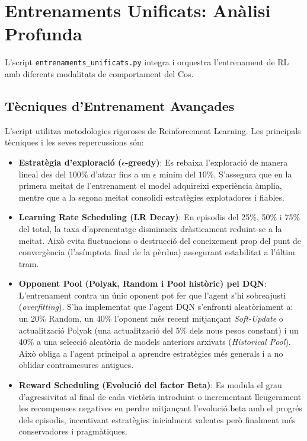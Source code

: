 \documentclass[a4paper,11pt]{article}
\begin{document}
\section{Entrenaments Unificats: Anàlisi Profunda}
L'script \texttt{entrenaments\_unificats.py} integra i orquestra l'entrenament de RL amb diferents modalitats de comportament del Cos.

\subsection{Tècniques d'Entrenament Avançades}
L'script utilitza metodologies rigoroses de Reinforcement Learning. Les principals tècniques i les seves repercussions són:
\begin{itemize}
    \item \textbf{Estratègia d'exploració ($\epsilon$-greedy)}: Es rebaixa l'exploració de manera lineal des del $100\%$ d'atzar fins a un $\epsilon$ mínim del $10\%$. S'assegura que en la primera meitat de l'entrenament el model adquireixi experiència àmplia, mentre que a la segona meitat consolidi estratègies explotadores i fiables.
    \item \textbf{Learning Rate Scheduling (LR Decay)}: En episodis del 25\%, 50\% i 75\% del total, la taxa d'aprenentatge disminueix dràsticament reduint-se a la meitat. Això evita fluctuacions o destrucció del coneixement prop del punt de convergència (l'asímptota final de la pèrdua) assegurant estabilitat a l'últim tram.
    \item \textbf{Opponent Pool (Polyak, Random i Pool històric) pel DQN}: L'entrenament contra un únic oponent pot fer que l'agent s'hi sobreajusti (\textit{overfitting}). S'ha implementat que l'agent DQN s'enfronti aleatòriament a: un 20\% Random, un 40\% l'oponent més recent mitjançant \textit{Soft-Update} o actualització Polyak (una actualització del 5\% dels nous pesos constant) i un 40\% a una selecció aleatòria de models anteriors arxivats (\textit{Historical Pool}). Això obliga a l'agent principal a aprendre estratègies més generals i a no oblidar contramesures antigues.
    \item \textbf{Reward Scheduling (Evolució del factor Beta)}: Es modula el grau d'agressivitat al final de cada victòria introduint o incrementant lleugerament les recompenses negatives en perdre mitjançant l'evolució beta amb el progrés dels episodis, incentivant estratègies inicialment valentes però finalment més conservadores i pragmàtiques.
\end{itemize}
\end{document}
